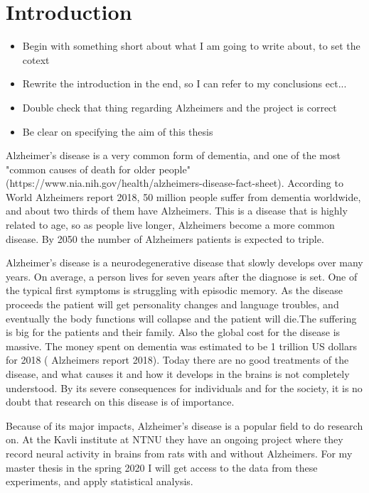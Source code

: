 
\chapter{Introduction}

\begin{itemize}
    \item Begin with something short about what I am going to write about, to set the cotext
    \item Rewrite the introduction in the end, so I can refer to my conclusions ect...
    \item Double check that thing regarding Alzheimers and the project is correct
    \item Be clear on specifying the aim of this thesis
\end{itemize}


Alzheimer's disease is a very common form of dementia, and one of the most "common causes of death for older people" (https://www.nia.nih.gov/health/alzheimers-disease-fact-sheet). According to World Alzheimers report 2018, 50 million people suffer from dementia worldwide, and about two thirds of them have Alzheimers. This is a disease that is highly related to age, so as people live longer, Alzheimers become a more common disease. By 2050 the number of Alzheimers patients is expected to triple.

Alzheimer's disease is a neurodegenerative disease that slowly develops over many years. On average, a person lives for seven years after the diagnose is set. One of the typical first symptoms is struggling with episodic memory. As the disease proceeds the patient will get personality changes and language troubles, and eventually the body functions will collapse and the patient will die.The suffering is big for the patients and their family.  Also the global cost for the disease is massive. The money spent on dementia was estimated to be 1 trillion US dollars for 2018 ( Alzheimers report 2018).
Today there are no good treatments of the disease, and what causes it and how it develops in the brains is not completely understood.  By its severe consequences for individuals and for the society, it is no doubt that research on this disease is of importance.

Because of its major impacts, Alzheimer's disease is a popular field to do research on. At the Kavli institute at NTNU they have an ongoing project where they record neural activity in brains from rats with and without Alzheimers. For my master thesis in the spring 2020 I will get access to the data from these experiments, and apply statistical analysis. 

